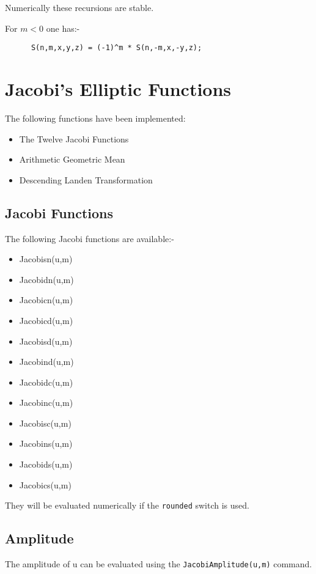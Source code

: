 Numerically these recursions are stable.

For $m < 0$ one has:-

\begin{verbatim}
      S(n,m,x,y,z) = (-1)^m * S(n,-m,x,-y,z);
\end{verbatim}

\section{Jacobi's Elliptic Functions}

The following functions have been implemented:

\begin{itemize}
\item The Twelve Jacobi Functions
\item Arithmetic Geometric Mean
\item Descending Landen Transformation
\end{itemize}

\subsection{Jacobi Functions}

The following Jacobi functions are available:-

\begin{itemize}
\item Jacobisn(u,m)
\item Jacobidn(u,m)
\item Jacobicn(u,m)
\item Jacobicd(u,m)
\item Jacobisd(u,m)
\item Jacobind(u,m)
\item Jacobidc(u,m)
\item Jacobinc(u,m)
\item Jacobisc(u,m)
\item Jacobins(u,m)
\item Jacobids(u,m)
\item Jacobics(u,m)
\end{itemize}

They will be evaluated numerically if the {\tt rounded} switch is used.

\subsection{Amplitude}

The amplitude of u can be evaluated using the
{\tt JacobiAmplitude(u,m)} command.


